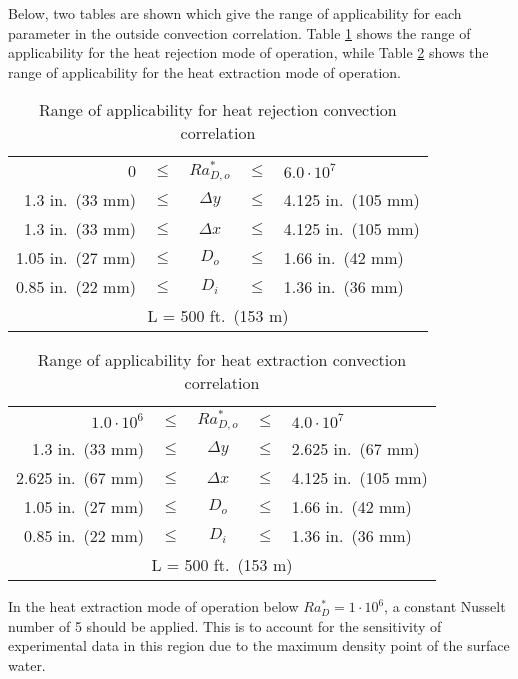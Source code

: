 Below, two tables are shown which give the range of applicability for each parameter in the outside convection correlation. Table \ref{tab:Correlation:PondHeatRej:RangeOfAppAgain} shows the range of applicability for the heat rejection mode of operation, while Table \ref{tab:Correlation:PoolHeatExtr:RangeOfAppAgain} shows the range of applicability for the heat extraction mode of operation.
	
	
	\begin{table}[h!]
		\centering
		\caption[Range of applicability for pond heat rejection correlation]{Range of applicability for heat rejection convection correlation}
		\label{tab:Correlation:PondHeatRej:RangeOfAppAgain}
		\begin{tabular}{r c c c l}
		0 & $\le$ &  $Ra_{D,o}^*$ & $\le$  & $6.0\cdot10^7$ \\
		1.3 in.\ (33 mm) & $\le$ & $\Delta y$ & $\le$ & 4.125 in.\ (105 mm) \\
		1.3 in.\ (33 mm) & $\le$ & $\Delta x$ & $\le$ & 4.125 in.\ (105 mm) \\
		1.05 in.\ (27 mm) & $\le$ &  $D_o$ &  $\le$ & 1.66 in.\ (42 mm) \\
		0.85 in.\ (22 mm) & $\le$ &  $D_i$ &  $\le$ & 1.36 in.\ (36 mm) \\
		\multicolumn{5}{c}{L = 500 ft.\ (153 m)} \\
		\end{tabular}
	\end{table}
	
	\begin{table}[h!]
		\centering
		\caption[Range of applicability for pool heat extraction correlation]{Range of applicability for heat extraction convection correlation}
		\label{tab:Correlation:PoolHeatExtr:RangeOfAppAgain}
		\begin{tabular}{r c c c l}
		$1.0\cdot10^6$ & $\le$ &  $Ra_{D,o}^*$ & $\le$  & $4.0\cdot10^7$ \\
		1.3 in.\ (33 mm) & $\le$ & $\Delta y$ & $\le$ & 2.625 in.\ (67 mm) \\
		2.625 in.\ (67 mm) & $\le$ & $\Delta x$ & $\le$ & 4.125 in.\ (105 mm) \\
		1.05 in.\ (27 mm) & $\le$ &  $D_o$ &  $\le$ & 1.66 in.\ (42 mm) \\
		0.85 in.\ (22 mm) & $\le$ &  $D_i$ &  $\le$ & 1.36 in.\ (36 mm) \\
		\multicolumn{5}{c}{L = 500 ft.\ (153 m)} \\
		\end{tabular}
	\end{table}
	
In the heat extraction mode of operation below $Ra_D^*=1\cdot10^6$, a constant Nusselt number of 5 should be applied. This is to account for the sensitivity of experimental data in this region due to the maximum density point of the surface water.